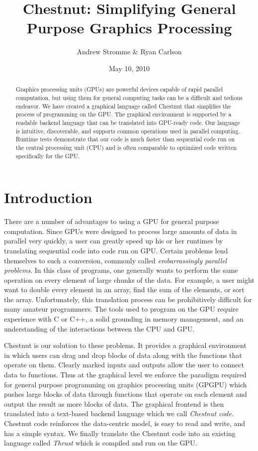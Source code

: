 \documentclass[twocolumn]{article}
\renewcommand{\|}{\origbar} %
\begin{document}
\title{Chestnut: Simplifying General Purpose Graphics Processing}
\author{Andrew Stromme \& Ryan Carlson}
\date{May 10, 2010}
\maketitle

\begin{abstract}
  Graphics processing units (GPUs) are powerful devices capable of rapid parallel computation, but using them for general computing tasks can be a difficult and tedious endeavor. We have created a graphical language called Chestnut that simplifies the process of programming on the GPU. The graphical environment is supported by a readable backend language that can be translated into GPU-ready code. Our language is intuitive, discoverable, and supports common operations used in parallel computing. Runtime tests demonstrate that our code is much faster than sequential code run on the central processing unit (CPU) and is often comparable to optimized code written specifically for the GPU.
\end{abstract}

\section{Introduction}

There are a number of advantages to using a GPU for general purpose computation. Since GPUs were designed to process large amounts of data in parallel very quickly, a user can greatly speed up his or her runtimes by translating sequential code into code run on GPU. Certain problems lend themselves to such a conversion, commonly called {\em embarrassingly parallel problems}. In this class of programs, one generally wants to perform the same operation on every element of large chunks of the data. For example, a user might want to double every element in an array, find the sum of the elements, or sort the array. Unfortunately, this translation process can be prohibitively difficult for many amateur programmers. The tools used to program on the GPU require experience with C or C++, a solid grounding in memory management, and an understanding of the interactions between the CPU and GPU. 

Chestnut is our solution to these problems. It provides a graphical environment in which users can drag and drop blocks of data along with the functions that operate on them. Clearly marked inputs and outputs allow the user to connect data to functions. Thus at the graphical level we enforce the paradigm required for general purpose programming on graphics processing units (GPGPU) which pushes large blocks of data through functions that operate on each element and output the result as more blocks of data. The graphical frontend is then translated into a text-based backend language which we call {\em Chestnut code}. Chestnut code reinforces the data-centric model, is easy to read and write, and has a simple syntax. We finally translate the Chestnut code into an existing language called {\em Thrust} which is compiled and run on the GPU.
\end{document}
